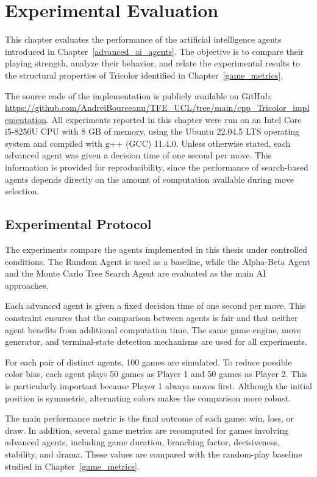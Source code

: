 \chapter{Experimental Evaluation}
\label{perf_analysis_of_agents}

This chapter evaluates the performance of the artificial intelligence agents introduced in Chapter~\ref{advanced_ai_agents}. The objective is to compare their playing strength, analyze their behavior, and relate the experimental results to the structural properties of Tricolor identified in Chapter~\ref{game_metrics}.

The source code of the implementation is publicly available on GitHub: \url{https://github.com/AndreiBourceanu/TFE_UCL/tree/main/cpp_Tricolor_implementation}. All experiments reported in this chapter were run on an Intel Core i5-8250U CPU with 8 GB of memory, using the Ubuntu 22.04.5 LTS operating system and compiled with g++ (GCC) 11.4.0. Unless otherwise stated, each advanced agent was given a decision time of one second per move. This information is provided for reproducibility, since the performance of search-based agents depends directly on the amount of computation available during move selection.

\section{Experimental Protocol}

The experiments compare the agents implemented in this thesis under controlled conditions. The Random Agent is used as a baseline, while the Alpha-Beta Agent and the Monte Carlo Tree Search Agent are evaluated as the main AI approaches.

Each advanced agent is given a fixed decision time of one second per move. This constraint ensures that the comparison between agents is fair and that neither agent benefits from additional computation time. The same game engine, move generator, and terminal-state detection mechanisms are used for all experiments.

For each pair of distinct agents, 100 games are simulated. To reduce possible color bias, each agent plays 50 games as Player 1 and 50 games as Player 2. This is particularly important because Player 1 always moves first. Although the initial position is symmetric, alternating colors makes the comparison more robust.

The main performance metric is the final outcome of each game: win, loss, or draw. In addition, several game metrics are recomputed for games involving advanced agents, including game duration, branching factor, decisiveness, stability, and drama. These values are compared with the random-play baseline studied in Chapter~\ref{game_metrics}.

